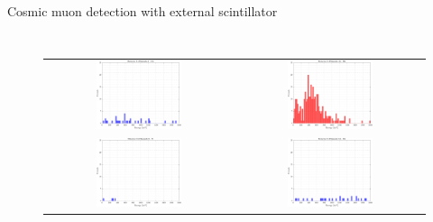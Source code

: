 \documentclass[aspectratio=169,xcolor=dvipsnamesz]{beamer} %
\newcommand\B{\rule[-1.2ex]{0pt}{0pt}} %
\begin{document}
\begin{frame}{Cosmic muon detection with external scintillator}
\begin{columns}
\begin{figure}[h!]
\begin{tabular}{c c}
                    \includegraphics[width=0.47\textwidth]{images/muon_detection/incoming_energy34_2hr_sens2_keV_lin.pdf} & \includegraphics[width=0.47\textwidth]{images/muon_detection/incoming_energy34_2hr_sens3_keV_lin.pdf}\B \\
                    \includegraphics[width=0.47\textwidth]{images/muon_detection/incoming_energy34_2hr_sens1_keV_lin.pdf} & \includegraphics[width=0.47\textwidth]{images/muon_detection/incoming_energy34_2hr_sens4_keV_lin.pdf}
                \end{tabular}
            \end{figure}
    \end{columns}
\end{frame}
\end{document}
